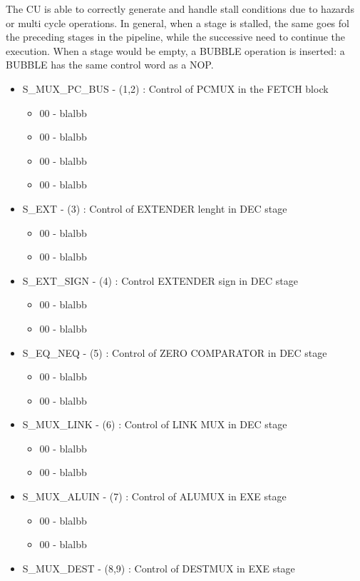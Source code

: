 \documentclass[12pt]{article}
\begin{document}
The CU is able to correctly generate and handle stall conditions due to hazards or multi cycle operations. In general, when a stage is stalled, the same goes fol the preceding stages in the pipeline, while the successive need to continue the execution. When a stage would be empty, a BUBBLE operation is inserted: a BUBBLE has the same control word as a NOP.
\begin{itemize}
	\item S\_MUX\_PC\_BUS - (1,2) : Control of PCMUX in the FETCH block
	\begin{itemize}
		\item 00 - blalbb 
		\item 00 - blalbb
		\item 00 - blalbb
		\item 00 - blalbb
	\end{itemize}
	\item S\_EXT - (3) : Control of EXTENDER lenght in DEC stage
	\begin{itemize}
		\item 00 - blalbb 
		\item 00 - blalbb
	\end{itemize}
	\item S\_EXT\_SIGN - (4) : Control EXTENDER sign in DEC stage
	\begin{itemize}
		\item 00 - blalbb 
		\item 00 - blalbb
	\end{itemize}
	\item S\_EQ\_NEQ - (5) : Control of ZERO COMPARATOR in DEC stage
	\begin{itemize}
		\item 00 - blalbb 
		\item 00 - blalbb
	\end{itemize}
	\item S\_MUX\_LINK - (6) : Control of LINK MUX in DEC stage
	\begin{itemize}
		\item 00 - blalbb 
		\item 00 - blalbb
	\end{itemize}
	\item S\_MUX\_ALUIN - (7) : Control of ALUMUX in EXE stage
	\begin{itemize}
		\item 00 - blalbb 
		\item 00 - blalbb
	\end{itemize}
	\item S\_MUX\_DEST - (8,9) : Control of DESTMUX in EXE stage

\end{itemize}
\end{document}
